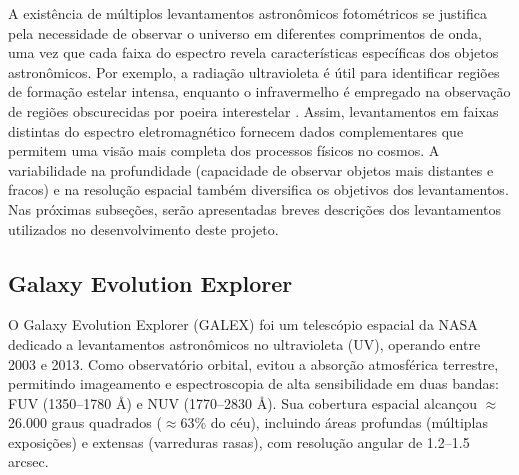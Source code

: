 A existência de múltiplos levantamentos astronômicos fotométricos se justifica pela necessidade de observar o universo em diferentes comprimentos de onda, uma vez que cada faixa do espectro revela características específicas dos objetos astronômicos. Por exemplo, a radiação ultravioleta é útil para identificar regiões de formação estelar intensa, enquanto o infravermelho é empregado na observação de regiões obscurecidas por poeira interestelar \cite[p. 28-31]{extragalactic-astronomy-book}. Assim, levantamentos em faixas distintas do espectro eletromagnético fornecem dados complementares que permitem uma visão mais completa dos processos físicos no cosmos. A variabilidade na profundidade (capacidade de observar objetos mais distantes e fracos) e na resolução espacial também diversifica os objetivos dos levantamentos. Nas próximas subseções, serão apresentadas breves descrições dos levantamentos utilizados no desenvolvimento deste projeto.







\subsection{Galaxy Evolution Explorer}
\label{sec:galex}

O Galaxy Evolution Explorer (GALEX) foi um telescópio espacial da NASA dedicado a levantamentos astronômicos no ultravioleta (UV), operando entre 2003 e 2013. Como observatório orbital, evitou a absorção atmosférica terrestre, permitindo imageamento e espectroscopia de alta sensibilidade em duas bandas: FUV (1350--1780 \AA) e NUV (1770--2830 \AA). Sua cobertura espacial alcançou $\approx$26.000 graus quadrados ($\approx$63\% do céu), incluindo áreas profundas (múltiplas exposições) e extensas (varreduras rasas), com resolução angular de 1.2--1.5 arcsec.

